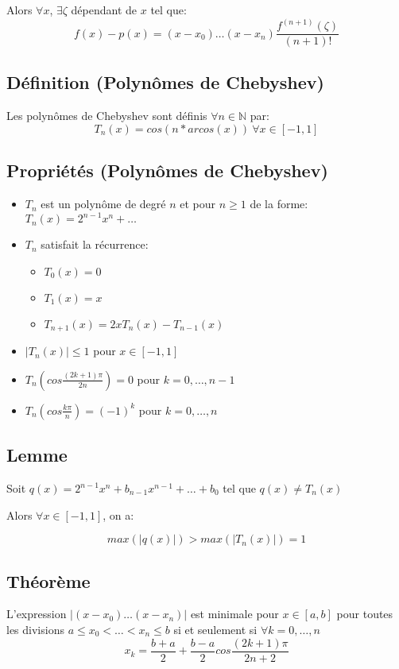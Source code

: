 \documentclass{article}
\newcommand{\N}{\mathbb{N}}
\begin{document}
Alors $\forall x$, $\exists \zeta$ dépendant de $x$ tel que:
$$f(x) - p(x) = (x - x_0)\dots(x - x_n)\frac{f^{(n + 1)}(\zeta)}{(n + 1)!}$$

\subsection{Définition (Polynômes de Chebyshev)}
Les polynômes de Chebyshev sont définis $\forall n \in \N$ par:
$$T_n(x) = cos(n * arcos(x))\ \forall x \in [-1, 1]$$

\subsection{Propriétés (Polynômes de Chebyshev)}
\begin{itemize}
    \item $T_n$ est un polynôme de degré $n$ et pour $n \geq 1$ de la forme: $T_n(x)=2^{n-1}x^n + \dots$
    \item $T_n$ satisfait la récurrence:
    \begin{itemize}
        \item $T_0(x) = 0$
        \item $T_1(x) = x$
        \item $T_{n + 1}(x) = 2xT_n(x) - T_{n -1}(x)$
    \end{itemize}
    \item $|T_n(x)| \leq 1$ pour $x \in [-1, 1]$
    \item $T_n(cos\frac{(2k + 1)\pi}{2n}) = 0$ pour $k = 0, \dots, n - 1$
    \item $T_n(cos\frac{k\pi}{n}) = (-1)^k$ pour $k = 0, \dots, n$
\end{itemize}

\subsection{Lemme}
Soit $q(x) = 2^{n - 1}x^n + b_{n-1}x^{n - 1} + \dots + b_0$ tel que $q(x) \neq T_n(x)$

Alors $\forall x \in [-1, 1]$, on a:

$$max(|q(x)|) > max(|T_n(x)|) = 1$$

\subsection{Théorème}
L'expression $|(x - x_0)\dots(x - x_n)|$ est minimale pour $x \in [a, b]$ pour toutes les divisions $a \leq x_0 < \dots < x_n \leq b$
si et seulement si $\forall k = 0, \dots, n$
$$x_k = \frac{b + a}{2} + \frac{b - a}{2}cos\frac{(2k + 1)\pi}{2n + 2}$$
\end{document}
